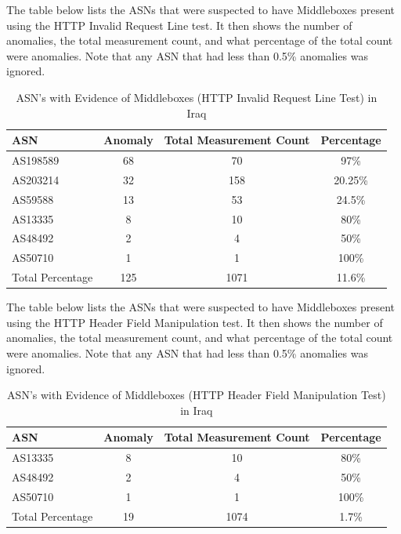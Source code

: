 The table below lists the ASNs that were suspected to have Middleboxes present using the HTTP Invalid Request Line test. It then shows the number of anomalies, the total measurement count, and what percentage of the total count were anomalies. Note that any ASN that had less than 0.5\% anomalies was ignored.

\begin{table}[H]
\centering
\caption{ASN's with Evidence of Middleboxes (HTTP Invalid Request Line Test) in Iraq}
\begin{tabular}{lccc}
\toprule
\textbf{ASN} & \textbf{Anomaly} & \textbf{Total Measurement Count} & \textbf{Percentage} \\
\midrule
AS198589  & 68 & 70 & 97\% \\
AS203214  & 32 & 158 & 20.25\% \\
AS59588   & 13 & 53 & 24.5\% \\
AS13335   & 8 & 10 & 80\% \\
AS48492   & 2 & 4 & 50\% \\
AS50710   & 1 & 1 & 100\% \\
\bottomrule
Total Percentage   & 125 & 1071 & 11.6\% \\
\end{tabular}
\label{tab:category_block}
\end{table}


The table below lists the ASNs that were suspected to have Middleboxes present using the HTTP Header Field Manipulation test. It then shows the number of anomalies, the total measurement count, and what percentage of the total count were anomalies. Note that any ASN that had less than 0.5\% anomalies was ignored.

\begin{table}[H]
\centering
\caption{ASN's with Evidence of Middleboxes (HTTP Header Field Manipulation Test) in Iraq}
\begin{tabular}{lccc}
\toprule
\textbf{ASN} & \textbf{Anomaly} & \textbf{Total Measurement Count} & \textbf{Percentage} \\
\midrule
AS13335   & 8 & 10 & 80\% \\
AS48492   & 2 & 4 & 50\% \\
AS50710   & 1 & 1 & 100\% \\
\bottomrule
Total Percentage   & 19 & 1074 & 1.7\% \\
\end{tabular}
\label{tab:category_block}
\end{table}


